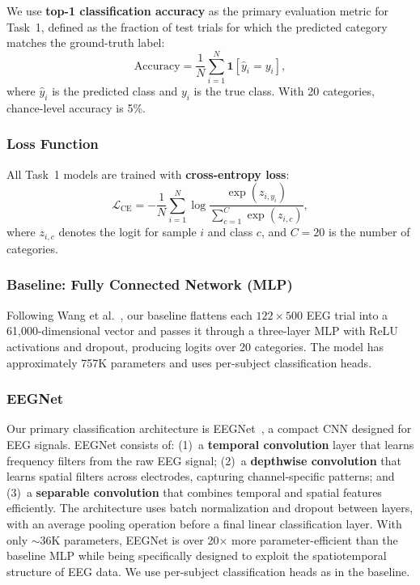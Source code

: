 \documentclass{article}
\begin{document}
We use \textbf{top-1 classification accuracy} as the primary evaluation metric for Task~1, defined as the fraction of test trials for which the predicted category matches the ground-truth label:
\begin{equation}
    \text{Accuracy} = \frac{1}{N}\sum_{i=1}^{N}\mathbf{1}[\hat{y}_i = y_i],
\end{equation}
where $\hat{y}_i$ is the predicted class and $y_i$ is the true class. With 20 categories, chance-level accuracy is 5\%.

\subsubsection{Loss Function}

All Task~1 models are trained with \textbf{cross-entropy loss}:
\begin{equation}
    \mathcal{L}_{\text{CE}} = -\frac{1}{N}\sum_{i=1}^{N}\log \frac{\exp(z_{i,y_i})}{\sum_{c=1}^{C}\exp(z_{i,c})},
\end{equation}
where $z_{i,c}$ denotes the logit for sample $i$ and class $c$, and $C=20$ is the number of categories.

\subsubsection{Baseline: Fully Connected Network (MLP)}

Following Wang et al.~\cite{wang2025eeg}, our baseline flattens each $122 \times 500$ EEG trial into a 61{,}000-dimensional vector and passes it through a three-layer MLP with ReLU activations and dropout, producing logits over 20 categories. The model has approximately 757K parameters and uses per-subject classification heads.

\subsubsection{EEGNet}

Our primary classification architecture is EEGNet~\cite{lawhern2018eegnet}, a compact CNN designed for EEG signals. EEGNet consists of: (1)~a \textbf{temporal convolution} layer that learns frequency filters from the raw EEG signal; (2)~a \textbf{depthwise convolution} that learns spatial filters across electrodes, capturing channel-specific patterns; and (3)~a \textbf{separable convolution} that combines temporal and spatial features efficiently. The architecture uses batch normalization and dropout between layers, with an average pooling operation before a final linear classification layer. With only $\sim$36K parameters, EEGNet is over 20$\times$ more parameter-efficient than the baseline MLP while being specifically designed to exploit the spatiotemporal structure of EEG data. We use per-subject classification heads as in the baseline.
\end{document}
